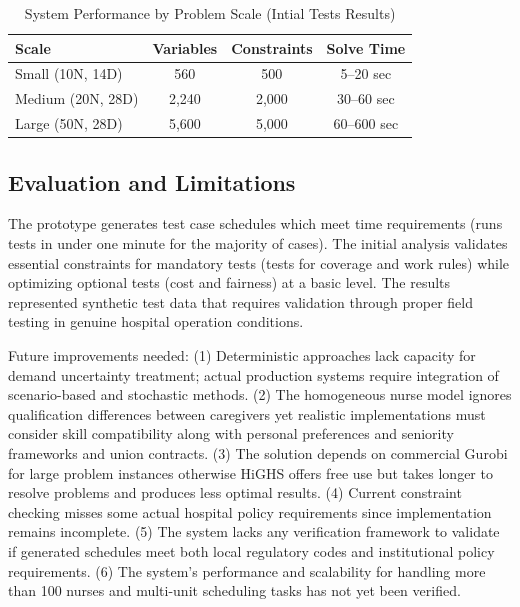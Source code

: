\documentclass[1pt,a4paper]{article}
\begin{document}
\begin{table}[h]
\centering
\caption{System Performance by Problem Scale (Intial Tests Results)}
\begin{tabular}{lccc}
\hline
\textbf{Scale} & \textbf{Variables} & \textbf{Constraints} & \textbf{Solve Time} \\
\hline
Small (10N, 14D) & 560 & 500 & 5--20 sec \\
Medium (20N, 28D) & 2,240 & 2,000 & 30--60 sec \\
Large (50N, 28D) & 5,600 & 5,000 & 60--600 sec \\
\hline
\end{tabular}
\end{table}

\subsection{Evaluation and Limitations}

The prototype generates test case schedules which meet time requirements (runs tests in under one minute for the majority of cases). The initial analysis validates essential constraints for mandatory tests (tests for coverage and work rules) while optimizing optional tests (cost and fairness) at a basic level. The results represented synthetic test data that requires validation through proper field testing in genuine hospital operation conditions.

\vspace{0.5cm}
Future improvements needed: (1) Deterministic approaches lack capacity for demand uncertainty treatment; actual production systems require integration of scenario-based and stochastic methods. (2) The homogeneous nurse model ignores qualification differences between caregivers yet realistic implementations must consider skill compatibility along with personal preferences and seniority frameworks and union contracts. (3) The solution depends on commercial Gurobi for large problem instances otherwise HiGHS offers free use but takes longer to resolve problems and produces less optimal results. (4) Current constraint checking misses some actual hospital policy requirements since implementation remains incomplete. (5) The system lacks any verification framework to validate if generated schedules meet both local regulatory codes and institutional policy requirements. (6) The system's performance and scalability for handling more than 100 nurses and multi-unit scheduling tasks has not yet been verified.
\end{document}
